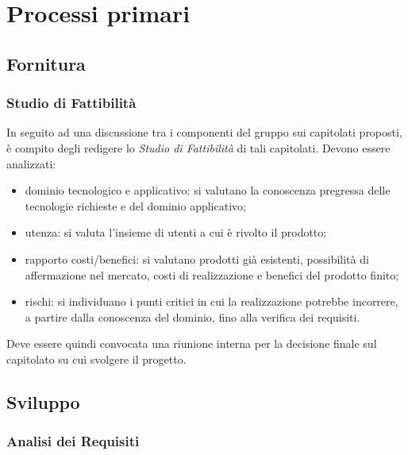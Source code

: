 \section{Processi primari}

\subsection{Fornitura}
\subsubsection{Studio di Fattibilità}
In seguito ad una discussione tra i componenti del gruppo sui capitolati proposti, è compito degli \Analisti{} redigere lo \textit{Studio di Fattibilità} di tali capitolati. Devono essere analizzati:
\begin{itemize}
	\item dominio tecnologico e applicativo: si valutano la conoscenza pregressa delle tecnologie richieste e del dominio applicativo;
	\item utenza: si valuta l'insieme di utenti a cui è rivolto il prodotto;
	\item rapporto costi/benefici: si valutano prodotti già esistenti, possibilità di affermazione nel mercato, costi di realizzazione e benefici del prodotto finito;
	\item rischi: si individuano i punti critici in cui la realizzazione potrebbe incorrere, a partire dalla conoscenza del dominio, fino alla verifica dei requisiti.
\end{itemize}
Deve essere quindi convocata una riunione interna per la decisione finale sul capitolato su cui svolgere il progetto.

\subsection{Sviluppo}

\subsubsection{Analisi dei Requisiti}
